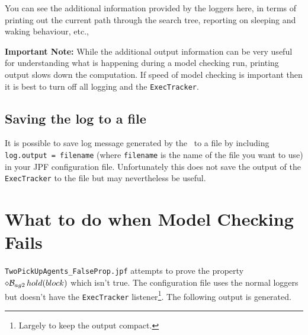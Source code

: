 You can see the additional information provided by the loggers here, in terms of printing out the current path through the search tree, reporting on sleeping and waking behaviour, etc.,

{\bf Important Note:} While the additional output information can be very useful for understanding what is happening during a model checking run, printing output slows down the computation.  If speed of model checking is important then it is best to turn off all logging and the \texttt{ExecTracker}.

\subsection{Saving the log to a file}
It is possible to save log message generated by the \ail\ to a file by including \texttt{log.output = filename} (where \texttt{filename} is the name of the file you want to use) in your JPF configuration file.  Unfortunately this does not save the output of the \texttt{ExecTracker} to the file but may nevertheless be useful.

\section{What to do when Model Checking Fails}

\texttt{TwoPickUpAgents\_FalseProp.jpf} attempts to prove the property $\diamond \mathrm{{\cal B}}_{ag2} \, hold(block)$ which isn't true.  The configuration file uses the normal loggers but doesn't have the \texttt{ExecTracker} listener\footnote{Largely to keep the output compact.}.  The following output is generated.

